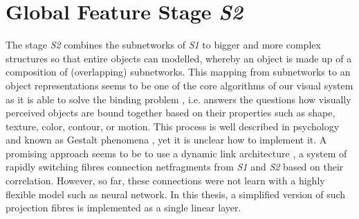 \section{Global Feature Stage \emph{S2}}

The stage \emph{S2} combines the subnetworks of \emph{S1} to bigger and more complex structures so that entire objects can modelled, whereby an object is made up of a composition of (overlapping) subnetworks.
This mapping from subnetworks to an object representations seems to be one of the core algorithms of our visual system as it is able to solve the binding problem , i.e. answers the questions how visually perceived objects are bound together based on their properties such as shape, texture, color, contour, or motion. This process is well described in psychology and known as Gestalt phenomena \cite{ellis_source_1938, kohler_gestalt_1992, wagemans_century_2012, hamlyn_psychology_2017}, yet it is unclear how to implement it.
A promising approach seems to be to use a dynamic link architecture , 
a system of rapidly switching fibres connection netfragments from \emph{S1} and \emph{S2} based on their correlation.
However, so far, these connections were not learn with a highly flexible model such as neural network.
In this thesis, a simplified version of such projection fibres is implemented as a single linear layer.


